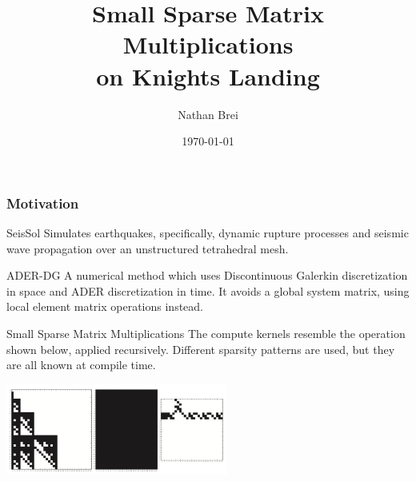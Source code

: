 \documentclass[9pt]{beamer}
\title{Small Sparse Matrix Multiplications\\ on Knights Landing}
\author{Nathan Brei}
\institute{Technical University of Munich}
\date\today
\begin{document}
\begin{frame}
  \titlepage
\end{frame}



\begin{frame}
  \frametitle{Motivation}
  
  \begin{block}{SeisSol}
    Simulates earthquakes, specifically, dynamic rupture processes and seismic wave propagation over an unstructured tetrahedral mesh. 
  \end{block}

  \begin{block}{ADER-DG}
    A numerical method which uses Discontinuous Galerkin discretization in space and ADER discretization in time. It avoids a global system matrix, using local element matrix operations instead.
  \end{block}

  \begin{block}{Small Sparse Matrix Multiplications}
    The compute kernels resemble the operation shown below, applied recursively. Different sparsity patterns are used, but they are all known at compile time.
  \end{block}

  \centering
  \includegraphics[height=3cm]{images/seissol_visc.png}

\end{frame}
\end{document}
